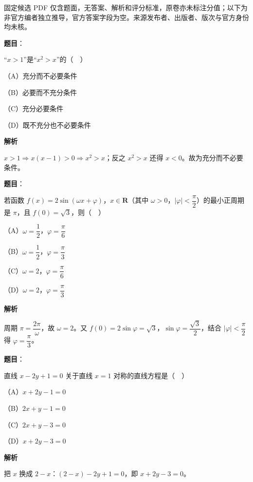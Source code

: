 

\begin{gktip}
固定候选 PDF 仅含题面，无答案、解析和评分标准，原卷亦未标注分值；以下为非官方编者独立推导，官方答案字段为空。来源发布者、出版者、版次与官方身份均未核。
\end{gktip}

\begin{answer}

\textbf{题目}：

“$x>1$”是“$x^2>x$”的（　）

（A）充分而不必要条件

（B）必要而不充分条件

（C）充分必要条件

（D）既不充分也不必要条件

\textbf{解析}

$x>1\Rightarrow x(x-1)>0\Rightarrow x^2>x$；反之 $x^2>x$ 还得 $x<0$。故为充分而不必要条件。


\end{answer}
\begin{answer}

\textbf{题目}：

若函数 $f(x)=2\sin(\omega x+\varphi)$，$x\in\mathbf R$（其中 $\omega>0$，$|\varphi|<\dfrac{\pi}{2}$）的最小正周期是 $\pi$，且 $f(0)=\sqrt3$，则（　）

（A）$\omega=\dfrac12$，$\varphi=\dfrac{\pi}{6}$

（B）$\omega=\dfrac12$，$\varphi=\dfrac{\pi}{3}$

（C）$\omega=2$，$\varphi=\dfrac{\pi}{6}$

（D）$\omega=2$，$\varphi=\dfrac{\pi}{3}$

\textbf{解析}

周期 $\pi=\dfrac{2\pi}{\omega}$，故 $\omega=2$。又 $f(0)=2\sin\varphi=\sqrt3$，$\sin\varphi=\dfrac{\sqrt3}{2}$，结合 $|\varphi|<\dfrac{\pi}{2}$ 得 $\varphi=\dfrac{\pi}{3}$。


\end{answer}
\begin{answer}

\textbf{题目}：

直线 $x-2y+1=0$ 关于直线 $x=1$ 对称的直线方程是（　）

（A）$x+2y-1=0$

（B）$2x+y-1=0$

（C）$2x+y-3=0$

（D）$x+2y-3=0$

\textbf{解析}

把 $x$ 换成 $2-x$：$(2-x)-2y+1=0$，即 $x+2y-3=0$。


\end{answer}
